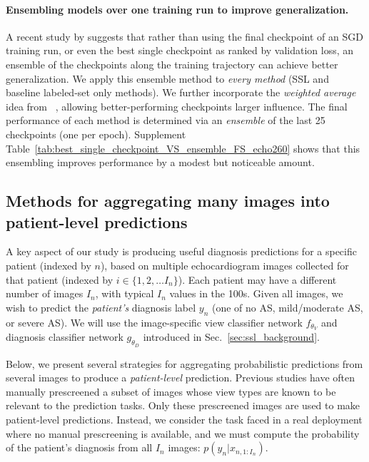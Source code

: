 \paragraph{Ensembling models over one training run to improve generalization.}
A recent study by \citet{huangSnapshotEnsemblesTrain2017} suggests that rather than using the final checkpoint of an SGD training run, or even the best single checkpoint as ranked by validation loss, an ensemble of the checkpoints along the training trajectory can achieve better generalization.
We apply this ensemble method to \emph{every method} (SSL and baseline labeled-set only methods). We further incorporate the \emph{weighted average} idea from~\citet{caruanaEnsembleSelectionLibraries2004} , allowing better-performing checkpoints larger influence.
The final performance of each method is determined via an \emph{ensemble} of the last 25 checkpoints (one per epoch).
Supplement Table~\ref{tab:best_single_checkpoint_VS_ensemble_FS_echo260} shows that this ensembling improves performance by a modest but noticeable amount.



\subsection{Methods for aggregating many images into patient-level predictions}
\label{sec:methods-patient-level}

A key aspect of our study is producing useful diagnosis predictions for a specific patient (indexed by $n$), based on multiple echocardiogram images collected for that patient (indexed by $i \in \{1, 2, \ldots I_n\}$). Each patient may have a different number of images $I_n$, with typical $I_n$ values in the 100s.
Given all images, we wish to predict the \emph{patient's} diagnosis label $y_n$ (one of no AS, mild/moderate AS, or severe AS).
We will use the image-specific view classifier network $f_{\theta_V}$ and diagnosis classifier network $g_{\theta_D}$ introduced in Sec.~\ref{sec:ssl_background}.

Below, we present several strategies for aggregating probabilistic predictions from several images to produce a \emph{patient-level} prediction.
Previous studies have often manually prescreened a subset of images whose view types are known to be relevant to the prediction tasks. Only these prescreened images are used to make patient-level predictions.
Instead, we consider the task faced in a real deployment where no manual prescreening is available, and we must compute the probability of the patient's diagnosis from all $I_n$ images: $p( y_n | x_{n, 1:I_n} )$.

